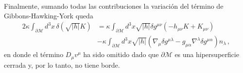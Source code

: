 \documentclass[../Main.tex]{subfiles}
\begin{document}
%
Finalmente, sumando todas las contribuciones la variación del término de Gibbons-Hawking-York queda
\begin{align}
    2\kappa\int_{\partial\mathcal{M}} d^{3}x\,\delta(\sqrt{\lvert h\rvert} K)&=\kappa\int_{\partial\mathcal{M}} d^{3}x\sqrt{\lvert h\rvert}\delta g^{\mu\nu}\left(-h_{\mu\nu}K+K_{\mu\nu}\right)\\
    &-\kappa\int_{\partial\mathcal{M}} d^{3}x\sqrt{\lvert h\rvert} \left(\nabla_{\mu}\delta g^{\mu\lambda}-g_{\mu\alpha}\nabla^{\lambda}\delta g^{\mu\alpha}\right)n_{\lambda}\, ,
\end{align}
en donde el término $D_{\mu}v^{\mu}$ ha sido omitido dado que $\partial{\mathcal{M}}$ es una hipersuperficie cerrada y, por lo tanto, no tiene borde. 
\end{document}
